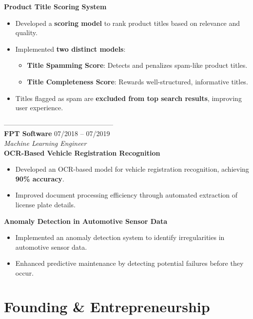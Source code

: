 \documentclass[10pt, letterpaper]{article}
\newenvironment{zitemize}{
\begin{itemize} \itemsep 0pt \parskip 0pt \parsep 1pt}
{\end{itemize}\vspace{-.5em}}
\begin{document}
\textbf{\small{Product Title Scoring System}}
\begin{zitemize}
    \vspace{-1mm}\item \small{Developed a \textbf{scoring model} to rank product titles based on relevance and quality.}
    \item \small{Implemented \textbf{two distinct models}:}
    \begin{zitemize}
        \item \small{\textbf{Title Spamming Score}: Detects and penalizes spam-like product titles.}
        \item \small{\textbf{Title Completeness Score}: Rewards well-structured, informative titles.}
    \end{zitemize}
    \item \small{Titles flagged as spam are \textbf{excluded from top search results}, improving user experience.}
\end{zitemize}
------------------------------------------------ \\
\textbf{FPT Software} \hfill 07/2018 – 07/2019 \\
\textit{Machine Learning Engineer} \\
\vspace{2mm}
\textbf{\small{OCR-Based Vehicle Registration Recognition}}
\begin{zitemize}
    \vspace{-1mm}\item \small{Developed an OCR-based model for vehicle registration recognition, achieving \textbf{90\% accuracy}.}
    \item \small{Improved document processing efficiency through automated extraction of license plate details.}
\end{zitemize}

\textbf{\small{Anomaly Detection in Automotive Sensor Data}}
\begin{zitemize}
    \vspace{-1mm}\item \small{Implemented an anomaly detection system to identify irregularities in automotive sensor data.}
    \item \small{Enhanced predictive maintenance by detecting potential failures before they occur.}
\end{zitemize}

\section{Founding \& Entrepreneurship}
\end{document}
